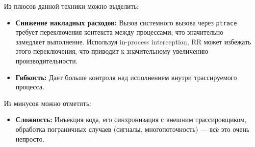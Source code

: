 Из плюсов данной техники можно выделить:
\begin{itemize}

  \item \textbf{Снижение накладных расходов: } Вызов системного вызова через
  \texttt{ptrace} требует переключения контекста между процессами, что
  значительно замедляет выполнение. Используя in-process interception, RR может
  избежать этого переключения, что приводит к значительному увеличению
  производительности.

  \item \textbf{Гибкость: } Дает больше контроля над исполнением внутри
  трассируемого процесса.

\end{itemize}

Из минусов можно отметить:

\begin{itemize}

  \item \textbf{Сложность: } Инъекция кода, его синхронизация с внешним
  трассировщиком, обработка пограничных случаев (сигналы, многопоточность) ---
  всё это очень непросто.

\end{itemize}





